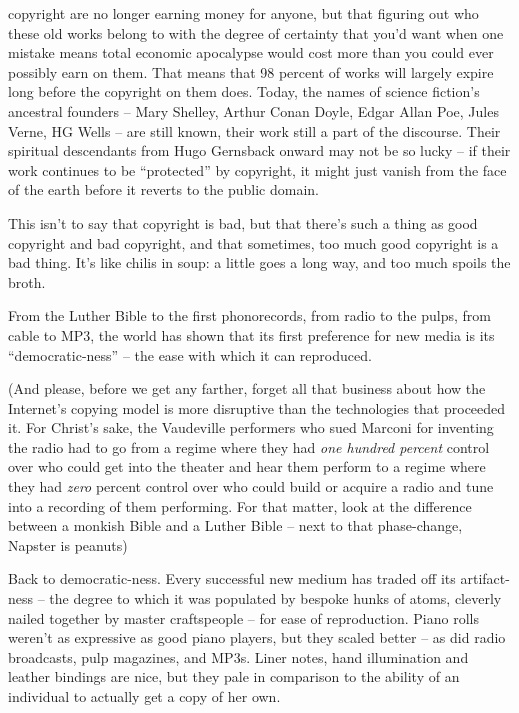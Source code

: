 \begin{itemize}
  copyright are no longer earning money for anyone, but that figuring
  out who these old works belong to with the degree of certainty that
  you'd want when one mistake means total economic apocalypse would
  cost more than you could ever possibly earn on them. That means
  that 98 percent of works will largely expire long before the
  copyright on them does. Today, the names of science fiction's
  ancestral founders -- Mary Shelley, Arthur Conan Doyle, Edgar Allan
  Poe, Jules Verne, HG Wells -- are still known, their work still a
  part of the discourse. Their spiritual descendants from Hugo
  Gernsback onward may not be so lucky -- if their work continues to
  be ``protected'' by copyright, it might just vanish from the face of
  the earth before it reverts to the public domain.
\end{itemize}
This isn't to say that copyright is bad, but that there's such a
thing as good copyright and bad copyright, and that sometimes, too
much good copyright is a bad thing. It's like chilis in soup: a
little goes a long way, and too much spoils the broth.

From the Luther Bible to the first phonorecords, from radio to the
pulps, from cable to MP3, the world has shown that its first
preference for new media is its ``democratic-ness'' -- the ease with
which it can reproduced.

(And please, before we get any farther, forget all that business
about how the Internet's copying model is more disruptive than the
technologies that proceeded it. For Christ's sake, the Vaudeville
performers who sued Marconi for inventing the radio had to go from
a regime where they had \emph{one hundred percent} control over
who could get into the theater and hear them perform to a regime
where they had \emph{zero} percent control over who could build
or acquire a radio and tune into a recording of them performing.
For that matter, look at the difference between a monkish Bible and
a Luther Bible -- next to that phase-change, Napster is peanuts)

Back to democratic-ness. Every successful new medium has traded off
its artifact-ness -- the degree to which it was populated by
bespoke hunks of atoms, cleverly nailed together by master
craftspeople -- for ease of reproduction. Piano rolls weren't as
expressive as good piano players, but they scaled better -- as did
radio broadcasts, pulp magazines, and MP3s. Liner notes, hand
illumination and leather bindings are nice, but they pale in
comparison to the ability of an individual to actually get a copy
of her own.

